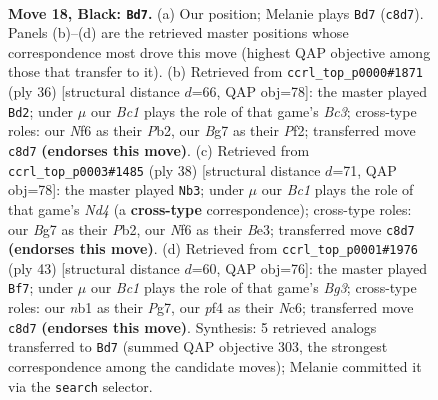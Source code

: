 \documentclass[11pt]{article}
\begin{document}
\clearpage

\begin{figure}[p]\centering
\begin{subfigure}{0.46\textwidth}\centering
\resizebox{\linewidth}{!}{%
\newchessgame
\chessboard[
  setfen={r1br2k1/2p3bp/Pp3np1/1P3p2/4pP1P/6PB/4P3/RNB2RK1 b - - 0 18},
  showmover=false,
  pgfstyle=straightmove, color=movearrow, markmove={c8-d7}
]}
\caption{}
\end{subfigure}\hfill
\begin{subfigure}{0.46\textwidth}\centering
\resizebox{\linewidth}{!}{%
\newchessgame
\chessboard[
  setfen={r1r3k1/3nppbp/6p1/pp1p1b2/3P4/1PB1PNP1/1P3PBP/R1R3K1 w - - 1 19},
  showmover=false,
  pgfstyle=straightmove, color=movearrow, markmove={c3-d2}
]}
\caption{}
\end{subfigure}
\\[4pt]
\begin{subfigure}{0.46\textwidth}\centering
\resizebox{\linewidth}{!}{%
\newchessgame
\chessboard[
  setfen={r3k2r/1b1p1np1/p2bp3/1p5p/3NP3/4BP2/PPP3P1/2KR1B1R w kq - 0 20},
  showmover=false,
  pgfstyle=straightmove, color=movearrow, markmove={d4-b3}
]}
\caption{}
\end{subfigure}\hfill
\begin{subfigure}{0.46\textwidth}\centering
\resizebox{\linewidth}{!}{%
\newchessgame
\chessboard[
  setfen={r5k1/1pp1r1pp/2np1pb1/8/p1P1PP2/P1B3P1/1P4BP/3RR1K1 b - - 0 22},
  showmover=false,
  pgfstyle=straightmove, color=movearrow, markmove={g6-f7}
]}
\caption{}
\end{subfigure}
\caption{\textbf{Move 18, Black: \texttt{Bd7}.} (a) Our position; Melanie plays \texttt{Bd7} (\texttt{c8d7}). Panels (b)--(d) are the retrieved master positions whose correspondence most drove this move (highest QAP objective among those that transfer to it). (b) Retrieved from \texttt{ccrl\_top\_p0000\#1871} (ply 36) [structural distance $d$=66, QAP obj=78]: the master played \texttt{Bd2}; under $\mu$ our \emph{Bc1} plays the role of that game's \emph{Bc3}; cross-type roles: our \emph{N}f6 as their \emph{P}b2, our \emph{B}g7 as their \emph{P}f2; transferred move \texttt{c8d7} \textbf{(endorses this move)}. (c) Retrieved from \texttt{ccrl\_top\_p0003\#1485} (ply 38) [structural distance $d$=71, QAP obj=78]: the master played \texttt{Nb3}; under $\mu$ our \emph{Bc1} plays the role of that game's \emph{Nd4} (a \textbf{cross-type} correspondence); cross-type roles: our \emph{B}g7 as their \emph{P}b2, our \emph{N}f6 as their \emph{B}e3; transferred move \texttt{c8d7} \textbf{(endorses this move)}. (d) Retrieved from \texttt{ccrl\_top\_p0001\#1976} (ply 43) [structural distance $d$=60, QAP obj=76]: the master played \texttt{Bf7}; under $\mu$ our \emph{Bc1} plays the role of that game's \emph{Bg3}; cross-type roles: our \emph{n}b1 as their \emph{P}g7, our \emph{p}f4 as their \emph{N}c6; transferred move \texttt{c8d7} \textbf{(endorses this move)}. Synthesis: 5 retrieved analogs transferred to \texttt{Bd7} (summed QAP objective 303, the strongest correspondence among the candidate moves); Melanie committed it via the \texttt{search} selector.}
\label{fig:thought-m35}
\end{figure}
\end{document}

